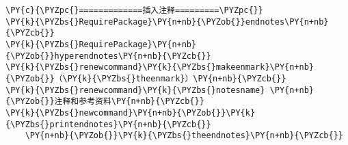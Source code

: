 \begin{Verbatim}[commandchars=\\\{\}]
\PY{c}{\PYZpc{}=============插入注释=========\PYZpc{}}
\PY{k}{\PYZbs{}RequirePackage}\PY{n+nb}{\PYZob{}}endnotes\PY{n+nb}{\PYZcb{}}
\PY{k}{\PYZbs{}RequirePackage}\PY{n+nb}{\PYZob{}}hyperendnotes\PY{n+nb}{\PYZcb{}}
\PY{k}{\PYZbs{}renewcommand}\PY{k}{\PYZbs{}makeenmark}\PY{n+nb}{\PYZob{}}（\PY{k}{\PYZbs{}theenmark}）\PY{n+nb}{\PYZcb{}}
\PY{k}{\PYZbs{}renewcommand}\PY{k}{\PYZbs{}notesname} \PY{n+nb}{\PYZob{}}注释和参考资料\PY{n+nb}{\PYZcb{}}
\PY{k}{\PYZbs{}newcommand}\PY{n+nb}{\PYZob{}}\PY{k}{\PYZbs{}printendnotes}\PY{n+nb}{\PYZcb{}}
    \PY{n+nb}{\PYZob{}}\PY{k}{\PYZbs{}theendnotes}\PY{n+nb}{\PYZcb{}}
\end{Verbatim}
